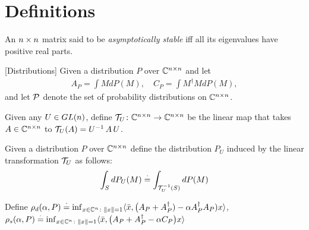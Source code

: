 \documentclass{article}
\begin{document}
\section{Definitions}
\begin{definition}
An $\ncn$ matrix said to be \emph{asymptotically stable} iff all its eigenvalues have positive real parts.
\end{definition}

\begin{definition}\label{def:dist}[Distributions]
Given a distribution $P$ over $\C^{\ncn}$ and let
\begin{align*}
A_P=\int M dP(M),\quad C_P=\int M^\dag M dP(M),
\end{align*}
and let $\P$ denote the set of probability distributions on $\C^{\ncn}$.
\end{definition}

\begin{definition}
Given any $U\in \gln$, define $\T_U \colon \C^{\ncn}\rightarrow \C^{\ncn}$ be the linear map that takes $A\in \C^{\ncn}$ to $\T_U(A)=U^{-1}\,A\,U$.
\end{definition}
\begin{definition}
Given a distribution $P$ over $\C^{\ncn}$ define the distribution $P_U$ induced by the linear transformation $\T_U$ as follows:
\begin{align*}
\int_{S} dP_U(M) \eqdef \int_{\T_U^{-1}(S)} dP(M)
\end{align*}
\end{definition}

\begin{comment}
\begin{definition}[Induced Distribution]
Let $P\in \P$ be any distribution over $\R^{\ncn}$ and let $p_c^U$ denote the probability distribution over $\C^{\ncn}$ induced by the linear map $\T_U$ such that the pullback of $p_c^U$ using $\T_U$ is $p$.
\end{definition}
\end{comment}

\begin{definition}
Define $\rhod{P}\eqdef {\inf}_{x\in\C^n\colon\norm{x}=1}\ip{\bar{x},\big(A_P+A_P^\dag)-\alpha A_P^\dag A_P)x}$, $\rhos{P}\eqdef{\inf}_{x\in \C^n\colon\norm{x}=1}\ip{\bar{x},\big(A_P+A_P^\dag-\alpha C_P\big)x}$
\end{definition}
\end{document}
